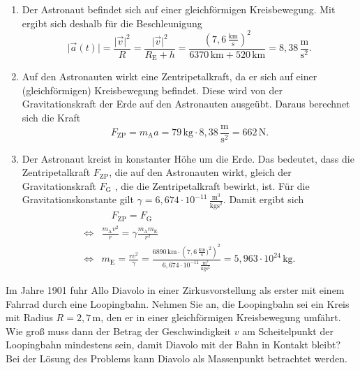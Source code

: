 \begin{MExercises}
\begin{MExercise}
  \begin{MSolution}
  \begin{enumerate}
  \item Der Astronaut befindet sich auf einer gleichf\"ormigen Kreisbewegung. Mit  ergibt sich deshalb f\"ur die Beschleunigung
  \begin{equation}
  \vert\vec{a}(t)\vert=\frac{\vert \vec{v}\vert^2}{R}=\frac{\vert \vec{v}\vert^2}{R_{\textrm{E}}+h}=\frac{(7{,}6\,\frac{\text{km}}{\text{s}})^2}{6370\,\text{km}+520\,\text{km}}=8,38\,\frac{\text{m}}{\text{s}^2}.
  \end{equation}  
  \item Auf den Astronauten wirkt eine Zentripetalkraft, da er sich auf einer (gleichf\"ormigen) Kreisbewegung befindet. Diese wird von der Gravitationskraft der Erde auf den Astronauten ausge\"ubt. Daraus berechnet sich die Kraft
  $$
  F_{{\textrm{ZP}}}=m_{\textrm{A}}a=79\,\text{kg}\cdot 8{,}38\,\frac{\text{m}}{\text{s}^2}=662\,\text{N.}
  $$
  \item Der Astronaut kreist in konstanter H\"ohe um die Erde. Das bedeutet, dass die Zentripetalkraft $F_{{\textrm{ZP}}}$, die auf den Astronauten wirkt, gleich der Gravitationskraft $F_{\textrm{G}}$ , die die Zentripetalkraft bewirkt, ist. F\"ur die Gravitationskonstante gilt $\gamma=6{,}674\cdot 10^{-11}\,\frac{\text{m}^3}{\text{kgs}^2}$. Damit ergibt sich
  \begin{eqnarray*}
  &\quad F_{\textrm{ZP}}=F_{\textrm{G}}\\\Leftrightarrow &\frac{m_{\textrm{A}}v^2}{r}=\gamma\frac{m_{\textrm{A}}m_{\textrm{E}}}{r^2}\\\Leftrightarrow
  &m_{\textrm{E}}=\frac{rv^2}{\gamma}=\frac{6890\,\text{km}\cdot\left(7{,}6\,\frac{\text{km}}{\text{s}})^2\right)^2 }{6{,}674\cdot 10^{-11}\,\frac{\text{m}^3}{\text{kg}\text{s}^2}}=5{,}963\cdot 10^{24}\,\text{kg}.
  \end{eqnarray*}
  \end{enumerate}
  \end{MSolution}
  \end{MExercise}
  \begin{MExercise}
  Im Jahre 1901 fuhr Allo Diavolo in einer Zirkusvorstellung als erster mit einem Fahrrad durch eine Loopingbahn. Nehmen Sie an, die Loopingbahn sei ein Kreis mit Radius $R=2{,}7\,\text{m}$, den er in einer gleichf\"ormigen Kreisbewegung umf\"ahrt. Wie gro{\ss} muss dann der Betrag der Geschwindigkeit $v$ am Scheitelpunkt der Loopingbahn mindestens sein, damit Diavolo mit der Bahn in Kontakt bleibt? Bei der L\"osung des Problems kann Diavolo als Massenpunkt betrachtet werden.
  

\end{MExercise}
\end{MExercises}
